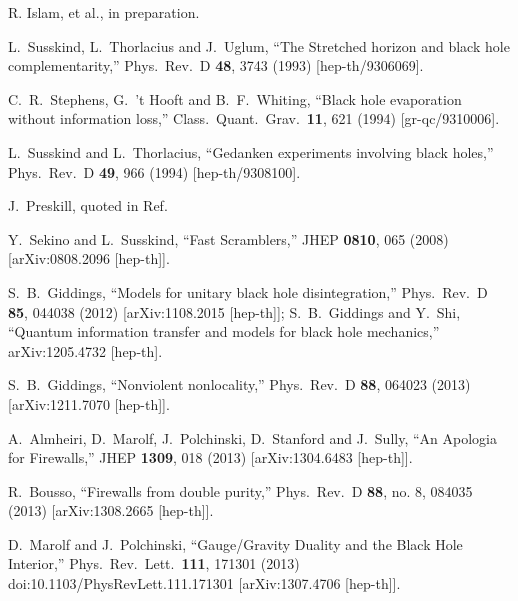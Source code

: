 \documentclass[12pt]{article}
\begin{document}
\begin{thebibliography}{99}
  
R. Islam, et al., in preparation.


  L.~Susskind, L.~Thorlacius and J.~Uglum,
  ``The Stretched horizon and black hole complementarity,''
  Phys.\ Rev.\ D {\bf 48}, 3743 (1993)
  [hep-th/9306069].

  C.~R.~Stephens, G.~'t Hooft and B.~F.~Whiting,
  ``Black hole evaporation without information loss,''
  Class.\ Quant.\ Grav.\  {\bf 11}, 621 (1994)
  [gr-qc/9310006].

  L.~Susskind and L.~Thorlacius,
  ``Gedanken experiments involving black holes,''
  Phys.\ Rev.\ D {\bf 49}, 966 (1994)
  [hep-th/9308100].

J.~Preskill, quoted in Ref.~\cite{Susskind:1993if}



  Y.~Sekino and L.~Susskind,
  ``Fast Scramblers,''
  JHEP {\bf 0810}, 065 (2008)
  [arXiv:0808.2096 [hep-th]].
  

  S.~B.~Giddings,
  ``Models for unitary black hole disintegration,''
  Phys.\ Rev.\ D {\bf 85}, 044038 (2012)
  [arXiv:1108.2015 [hep-th]];
    S.~B.~Giddings and Y.~Shi,
  ``Quantum information transfer and models for black hole mechanics,''
  arXiv:1205.4732 [hep-th].

  S.~B.~Giddings,
  ``Nonviolent nonlocality,''
  Phys.\ Rev.\ D {\bf 88}, 064023 (2013)
  [arXiv:1211.7070 [hep-th]].

 
  A.~Almheiri, D.~Marolf, J.~Polchinski, D.~Stanford and J.~Sully,
  ``An Apologia for Firewalls,''
  JHEP {\bf 1309}, 018 (2013)
  [arXiv:1304.6483 [hep-th]].
    
  R.~Bousso,
  ``Firewalls from double purity,''
  Phys.\ Rev.\ D {\bf 88}, no. 8, 084035 (2013)
  [arXiv:1308.2665 [hep-th]].
  
  D.~Marolf and J.~Polchinski,
  ``Gauge/Gravity Duality and the Black Hole Interior,''
  Phys.\ Rev.\ Lett.\  {\bf 111}, 171301 (2013)
  doi:10.1103/PhysRevLett.111.171301
  [arXiv:1307.4706 [hep-th]].


\end{thebibliography}
\end{document}

